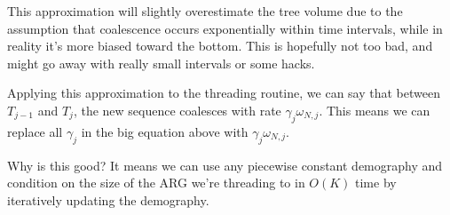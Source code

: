 \documentclass[a4paper]{article}
\begin{document}
This approximation will slightly overestimate the tree volume due to the assumption that
coalescence occurs exponentially within time intervals, while in reality it's more biased toward the bottom.
This is hopefully not too bad, and might go away with really small intervals or some hacks.

Applying this approximation to the threading routine, we can say that
between $T_{j-1}$ and $T_{j}$, the new sequence coalesces with rate $\gamma_j\omega_{N,j}$.
This means we can replace all $\gamma_j$ in the big equation above with $\gamma_j\omega_{N,j}$.

Why is this good? 
It means we can use any piecewise constant demography and condition on the size of the ARG 
we're threading to in $O(K)$ time by iteratively updating the demography.
\end{document}
